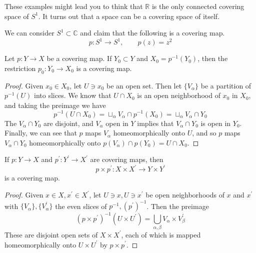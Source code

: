   These examples might lead you to think that $\mathbb{R}$ is the only connected covering space of $S^1$. It turns out that a space can be a covering space of itself. 

  \begin{example}
    We can consider $S^1 \subset \mathbb{C}$ and claim that the following is a covering map. 
    \begin{equation}
      p: S^1 \to S^1, \qquad p(z) = z^2
    \end{equation}
  \end{example}

  \begin{theorem}
    Let $p: Y \to X$ be a covering map. If $Y_0 \subset Y$ and $X_0 = p^{-1}  (Y_0)$, then the restriction $p_0: Y_0 \to X_0$ is a covering map. 
  \end{theorem}
  \begin{proof}
    Given $x_0 \in X_0$, let $U \ni x_0$ be an open set. Then let $\{V_\alpha\}$ be a partition of $p^{-1} (U)$ into slices. We know that $U \cap X_0$ is an open neighborhood of $x_0$ in $X_0$, and taking the preimage we have 
    \begin{equation}
      p^{-1} (U \cap X_0) = \sqcup_\alpha V_\alpha \cap p^{-1} (X_0) = \sqcup_\alpha V_\alpha \cap Y_0
    \end{equation}
    The $V_\alpha \cap Y_0$ are disjoint, and $V_\alpha$ open in $Y$ implies that $V_\alpha \cap Y_0$ is open in $Y_0$. Finally, we can see that $p$ maps $V_\alpha$ homeomorphically onto $U$, and so $p$ maps $V_\alpha \cap Y_0$ homeomorphically onto $p(V_\alpha) \cap p(Y_0) = U \cap X_0$. 
  \end{proof}

  \begin{theorem}
    If $p: Y \to X$ and $p^\prime : Y^\prime \to X^\prime$ are covering maps, then 
    \begin{equation}
      p \times p^\prime : X \times X^\prime \to Y \times Y^\prime
    \end{equation}
    is a covering map. 
  \end{theorem}
  \begin{proof}
    Given $x \in X, x^\prime \in X^\prime$, let $U \ni x, U \ni x^\prime$ be open neighborhoods of $x$ and $x^\prime$ with $\{V_\alpha\}, \{V_\alpha^\prime\}$ the even slices of $p^{-1}, (p^\prime)^{-1}$. Then the preimage 
    \begin{equation}
      (p \times p^\prime)^{-1} (U \times U^\prime) = \bigcup_{\alpha, \beta} V_\alpha \times V_\beta^\prime 
    \end{equation}
    These are disjoint open sets of $X \times X^\prime$, each of which is mapped homeomorphically onto $U \times U^\prime$ by $p \times p^\prime$. 
  \end{proof}

